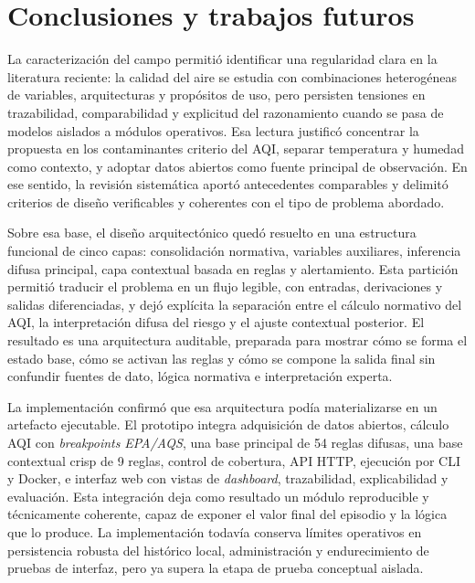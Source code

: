 
\section{Conclusiones y trabajos futuros}

La caracterización del campo permitió identificar una regularidad clara en la literatura reciente: la calidad del aire se estudia con combinaciones heterogéneas de variables, arquitecturas y propósitos de uso, pero persisten tensiones en trazabilidad, comparabilidad y explicitud del razonamiento cuando se pasa de modelos aislados a módulos operativos. Esa lectura justificó concentrar la propuesta en los contaminantes criterio del AQI, separar temperatura y humedad como contexto, y adoptar datos abiertos como fuente principal de observación. En ese sentido, la revisión sistemática aportó antecedentes comparables y delimitó criterios de diseño verificables y coherentes con el tipo de problema abordado.

Sobre esa base, el diseño arquitectónico quedó resuelto en una estructura funcional de cinco capas: consolidación normativa, variables auxiliares, inferencia difusa principal, capa contextual basada en reglas y alertamiento. Esta partición permitió traducir el problema en un flujo legible, con entradas, derivaciones y salidas diferenciadas, y dejó explícita la separación entre el cálculo normativo del AQI, la interpretación difusa del riesgo y el ajuste contextual posterior. El resultado es una arquitectura auditable, preparada para mostrar cómo se forma el estado base, cómo se activan las reglas y cómo se compone la salida final sin confundir fuentes de dato, lógica normativa e interpretación experta.

La implementación confirmó que esa arquitectura podía materializarse en un artefacto ejecutable. El prototipo integra adquisición de datos abiertos, cálculo AQI con \textit{breakpoints} \textit{EPA/AQS}, una base principal de 54 reglas difusas, una base contextual crisp de 9 reglas, control de cobertura, API HTTP, ejecución por CLI y Docker, e interfaz web con vistas de \textit{dashboard}, trazabilidad, explicabilidad y evaluación. Esta integración deja como resultado un módulo reproducible y técnicamente coherente, capaz de exponer el valor final del episodio y la lógica que lo produce. La implementación todavía conserva límites operativos en persistencia robusta del histórico local, administración y endurecimiento de pruebas de interfaz, pero ya supera la etapa de prueba conceptual aislada.

